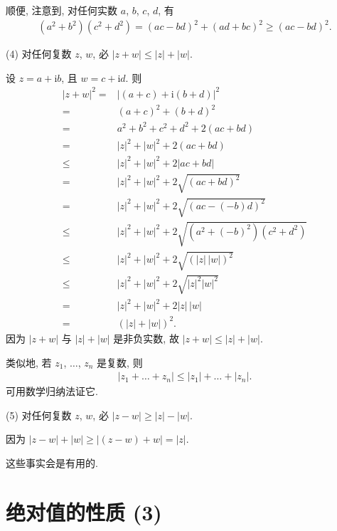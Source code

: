 顺便, 注意到, 对任何实数 \(a\), \(b\), \(c\), \(d\),
有
\begin{align*}
    (a^2 + b^2) (c^2 + d^2)
    = (ac - bd)^2 + (ad + bc)^2
    \geq (ac - bd)^2.
\end{align*}

(4)
对任何复数 \(z\), \(w\), 必 \(|{z + w}| \leq |z| + |w|\).

设 \(z = a + \mathrm{i} b\), 且 \(w = c + \mathrm{i} d\).
则
\begin{align*}
    |{z + w}|^2
    = {}    & |{(a + c) + \mathrm{i} (b + d)}|^2      \\
    = {}    & (a + c)^2 + (b + d)^2                   \\
    = {}    & a^2 + b^2 + c^2 + d^2 + 2(ac + bd)      \\
    = {}    & |z|^2 + |w|^2 + 2(ac + bd)              \\
    \leq {} & |z|^2 + |w|^2 + 2|{ac + bd}|            \\
    = {}    & |z|^2 + |w|^2 + 2 \sqrt{(ac + bd)^2}    \\
    = {}    & |z|^2 + |w|^2 + 2 \sqrt{(ac - (-b)d)^2} \\
    \leq {} & |z|^2 + |w|^2
    + 2 \sqrt{(a^2 + (-b)^2) (c^2 + d^2)}             \\
    \leq {} & |z|^2 + |w|^2 + 2 \sqrt{(|z|\,|w|)^2}   \\
    \leq {} & |z|^2 + |w|^2 + 2 \sqrt{|z|^2 |w|^2}    \\
    = {}    & |z|^2 + |w|^2 + 2 |z|\, |w|             \\
    = {}    & (|z| + |w|)^2.
\end{align*}
因为 \(|{z + w}|\) 与 \(|z| + |w|\) 是非负实数,
故 \(|{z + w}| \leq |z| + |w|\).

类似地, 若 \(z_1\), \(\dots\), \(z_n\) 是复数, 则
\begin{align*}
    |{z_1 + \dots + z_n}| \leq |z_1| + \dots + |z_n|.
\end{align*}
可用数学归纳法证它.

(5)
对任何复数 \(z\), \(w\), 必 \(|{z - w}| \geq |z| - |w|\).

因为 \(|{z - w}| + |w| \geq |{(z - w) + w}| = |z|\).

\vspace{2ex}

这些事实会是有用的.

\section{绝对值的性质 (3)}

